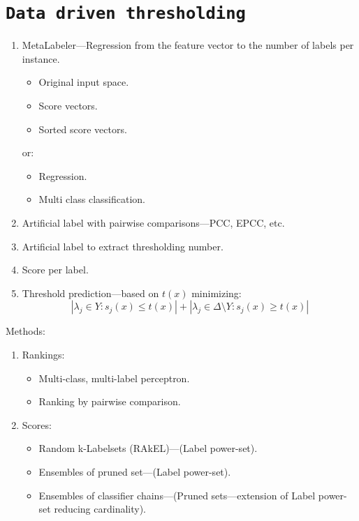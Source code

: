 \documentclass[12pt,a4paper,twocolumn]{article}
\begin{document}
\section*{\texttt{Data driven thresholding}}
\begin{enumerate}
\item MetaLabeler---Regression from the feature vector to the number of labels per instance.
	\begin{itemize} %
	\item Original input space.
	\item Score vectors.
	\item Sorted score vectors.
	\end{itemize}

	or:

	\begin{itemize} %
	\item Regression.
	\item Multi class classification.
	\end{itemize}

\item Artificial label with pairwise comparisons---PCC, EPCC, etc.
\item Artificial label to extract thresholding number.
\item Score per label.
\item Threshold prediction---based on $t(x)$ minimizing:
	$$
	| \lambda_j \in Y : s_j(x) \leq t(x) | + | \lambda_j \in \Delta \text{\textbackslash{}} Y : s_j(x) \geq t(x) |
	$$
\end{enumerate}

Methods:
\begin{enumerate}
\item Rankings:
	\begin{itemize}
	\item Multi-class, multi-label perceptron.
	\item Ranking by pairwise comparison.
	\end{itemize}
\item Scores:
	\begin{itemize}
	\item Random k-Labelsets (RAkEL)---(Label power-set).
	\item Ensembles of pruned set---(Label power-set).
	\item Ensembles of classifier chains---(Pruned sets---extension of Label power-set reducing cardinality).
	\end{itemize}
\end{enumerate}
\end{document}

